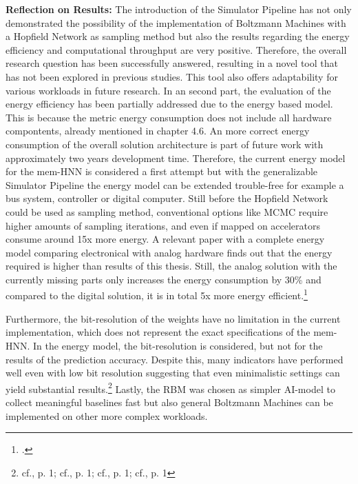 \textbf{Reflection on Results:} The introduction of the Simulator Pipeline has not only demonstrated the possibility 
of the implementation of Boltzmann Machines with a Hopfield Network as sampling method but also the results regarding
the energy efficiency and computational throughput are very positive.
Therefore, the overall research question has been successfully answered, resulting in a novel tool that has not been explored in previous studies.
This tool also offers adaptability for various workloads in future research.
In an second part, the evaluation of the energy efficiency has been partially addressed due to the energy based model.
This is because the metric energy consumption does not include all hardware compontents, already mentioned in chapter 4.6.
An more correct energy consumption of the overall solution architecture is part of future work with approximately two years development time.
Therefore, the current energy model for the \ac{mem-HNN} is considered a first attempt but with the generalizable Simulator Pipeline
the energy model can be extended trouble-free for example a bus system, controller or digital computer.
Still before the Hopfield Network could be used as sampling method, conventional options like \ac{MCMC} 
require higher amounts of sampling iterations, and even if mapped on accelerators consume around 15x more energy.
A relevant paper with a complete energy model comparing electronical with analog hardware finds out that the energy required is 
higher than results of this thesis. Still, the analog solution with the currently missing parts only increases the energy consumption by 30\% and compared to
the digital solution, it is in total 5x more energy efficient.\footcite[cf.][12-13]{demirkiranElectroPhotonicSystemAccelerating2023}

Furthermore, the bit-resolution of the weights have no limitation in the current implementation, which does not represent the
exact specifications of the \ac{mem-HNN}. 
In the energy model, the bit-resolution is considered, but not for the results of the prediction accuracy. 
Despite this, many indicators have performed well even with low bit resolution suggesting that even minimalistic settings can yield substantial results.\footnote{cf.\cite{maEra1bitLLMs2024}, p. 1; cf.\cite{GitHubHtqinQuantSR}, p. 1; cf.\cite{rouhaniMicroscalingDataFormats2023}, p. 1; cf.\cite{rouhaniSharedMicroexponentsLittle2023}, p. 1}
Lastly, the \ac{RBM} was chosen as simpler AI-model to collect meaningful baselines fast but also general Boltzmann Machines can be implemented on other more complex workloads. 

